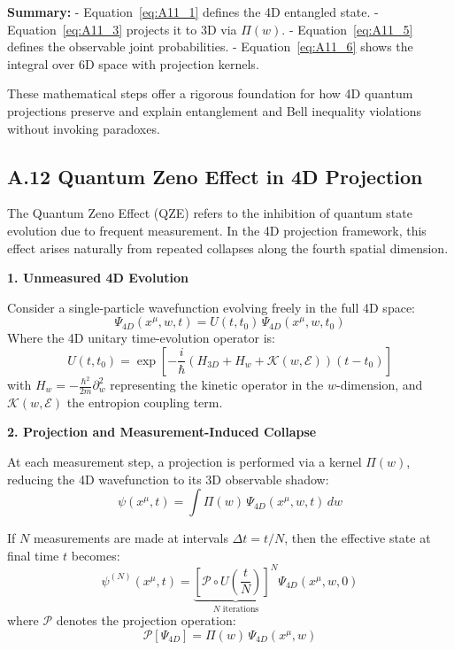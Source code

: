 \documentclass[12pt]{article}
\begin{document}
\bigskip
\textbf{Summary:}  
- Equation~\eqref{eq:A11_1} defines the 4D entangled state.  
- Equation~\eqref{eq:A11_3} projects it to 3D via \(\Pi(w)\).  
- Equation~\eqref{eq:A11_5} defines the observable joint probabilities.  
- Equation~\eqref{eq:A11_6} shows the integral over 6D space with projection kernels.  

These mathematical steps offer a rigorous foundation for how 4D quantum projections preserve and explain entanglement and Bell inequality violations without invoking paradoxes.

\subsection*{A.12 \quad Quantum Zeno Effect in 4D Projection}
\label{eq:A12}

The Quantum Zeno Effect (QZE) refers to the inhibition of quantum state evolution due to frequent measurement. In the 4D projection framework, this effect arises naturally from repeated collapses along the fourth spatial dimension.

\bigskip
\textbf{1. Unmeasured 4D Evolution}

Consider a single-particle wavefunction evolving freely in the full 4D space:
\begin{equation}
\Psi_{4D}(x^\mu, w, t) = U(t, t_0)\, \Psi_{4D}(x^\mu, w, t_0)
\label{eq:A12_1}
\end{equation}
Where the 4D unitary time-evolution operator is:
\begin{equation}
U(t, t_0) = \exp\left[-\frac{i}{\hbar}(H_{3D} + H_w + \mathcal{K}(w, \mathcal{E})) (t - t_0)\right]
\label{eq:A12_2}
\end{equation}
with \(H_w = -\frac{\hbar^2}{2m} \partial_w^2\) representing the kinetic operator in the \(w\)-dimension, and \(\mathcal{K}(w, \mathcal{E})\) the entropion coupling term.

\bigskip
\textbf{2. Projection and Measurement-Induced Collapse}

At each measurement step, a projection is performed via a kernel \(\Pi(w)\), reducing the 4D wavefunction to its 3D observable shadow:
\begin{equation}
\psi(x^\mu, t) = \int \Pi(w)\, \Psi_{4D}(x^\mu, w, t)\, dw
\label{eq:A12_3}
\end{equation}

If \(N\) measurements are made at intervals \(\Delta t = t/N\), then the effective state at final time \(t\) becomes:
\begin{equation}
\psi^{(N)}(x^\mu, t) = \underbrace{\left[\mathcal{P} \circ U\left(\frac{t}{N}\right)\right]^N}_{N \text{ iterations}} \Psi_{4D}(x^\mu, w, 0)
\label{eq:A12_4}
\end{equation}
where \(\mathcal{P}\) denotes the projection operation:
\begin{equation}
\mathcal{P}[\Psi_{4D}] = \Pi(w)\, \Psi_{4D}(x^\mu, w)
\end{equation}
\end{document}
